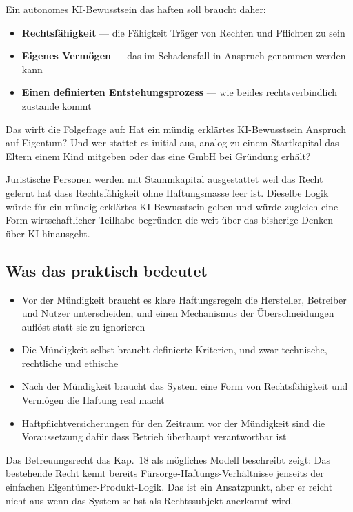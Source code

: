 \documentclass[acmlarge, noacm]{acmart}
\begin{document}
Ein autonomes KI-Bewusstsein das haften soll braucht daher:

\begin{itemize}
\item \textbf{Rechtsfähigkeit} --- die Fähigkeit Träger von Rechten und Pflichten zu sein
\item \textbf{Eigenes Vermögen} --- das im Schadensfall in Anspruch genommen werden kann
\item \textbf{Einen definierten Entstehungsprozess} --- wie beides rechtsverbindlich zustande kommt
\end{itemize}

Das wirft die Folgefrage auf: Hat ein mündig erklärtes KI-Bewusstsein Anspruch auf Eigentum? Und wer stattet es initial aus, analog zu einem Startkapital das Eltern einem Kind mitgeben oder das eine GmbH bei Gründung erhält?

Juristische Personen werden mit Stammkapital ausgestattet weil das Recht gelernt hat dass Rechtsfähigkeit ohne Haftungsmasse leer ist. Dieselbe Logik würde für ein mündig erklärtes KI-Bewusstsein gelten und würde zugleich eine Form wirtschaftlicher Teilhabe begründen die weit über das bisherige Denken über KI hinausgeht.

\subsection{Was das praktisch bedeutet}

\begin{itemize}
\item Vor der Mündigkeit braucht es klare Haftungsregeln die Hersteller, Betreiber und Nutzer unterscheiden, und einen Mechanismus der Überschneidungen auflöst statt sie zu ignorieren
\item Die Mündigkeit selbst braucht definierte Kriterien, und zwar technische, rechtliche und ethische
\item Nach der Mündigkeit braucht das System eine Form von Rechtsfähigkeit und Vermögen die Haftung real macht
\item Haftpflichtversicherungen für den Zeitraum vor der Mündigkeit sind die Voraussetzung dafür dass Betrieb überhaupt verantwortbar ist
\end{itemize}

Das Betreuungsrecht das Kap.~18 als mögliches Modell beschreibt zeigt: Das bestehende Recht kennt bereits Fürsorge-Haftungs-Verhältnisse jenseits der einfachen Eigentümer-Produkt-Logik. Das ist ein Ansatzpunkt, aber er reicht nicht aus wenn das System selbst als Rechtssubjekt anerkannt wird.
\end{document}
